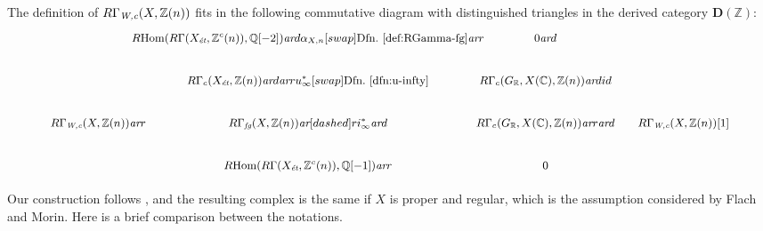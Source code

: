 \documentclass[leqno,12pt]{article}
\theoremstyle{plain}
\theoremstyle{definition}
\DeclareMathOperator{\Hom}{Hom}
\newcommand{\CC}{\mathbb{C}}
\newcommand{\QQ}{\mathbb{Q}}
\newcommand{\RR}{\mathbb{R}}
\newcommand{\ZZ}{\mathbb{Z}}
\newcommand{\Wc}{\text{\it W,c}}
\newcommand{\ar}{\text{\it ar}}
\newcommand{\et}{\text{\it \'{e}t}}
\newcommand{\fg}{\text{\it fg}}
\newcommand{\RHom}{R\!\Hom}
\newcommand{\DZ}{{\mathbf{D} (\ZZ)}}
\begin{document}
The definition of $R\Gamma_\Wc (X,\ZZ(n))$ fits in the following commutative
diagram with distinguished triangles in the derived category $\DZ$:
\begin{equation}
  \label{eqn:diagram-defining-everything}
  \begin{tikzcd}[column sep=1em,font=\small]
    &[-3em] \RHom (R\Gamma (X_\et, \ZZ^c (n)), \QQ [-2]) \ar{d}{\alpha_{X,n}}[swap]{\text{Dfn.~\ref{def:RGamma-fg}}} \ar{r} &[-2.5em] 0 \ar{d} \\
    & R\Gamma_c (X_\et, \ZZ(n)) \ar{d}\ar{r}{u_\infty^*}[swap]{\text{Dfn.~\ref{dfn:u-infty}}} & R\Gamma_c (G_\RR, X (\CC), \ZZ(n))\ar{d}{id} \\
    R\Gamma_\Wc (X, \ZZ (n)) \ar{r} & R\Gamma_\fg (X, \ZZ(n)) \ar[dashed]{r}{i_\infty^*}\ar{d} & R\Gamma_c (G_\RR, X (\CC), \ZZ(n)) \ar{r} \ar{d} & R\Gamma_\Wc (X, \ZZ (n)) [1] \\
    & \RHom (R\Gamma (X_\et, \ZZ^c (n)), \QQ [-1]) \ar{r} & 0
  \end{tikzcd}
\end{equation}

Our construction follows \cite{Flach-Morin-2018}, and the resulting complex is
the same if $X$ is proper and regular, which is the assumption considered
by Flach and Morin. Here is a brief comparison between the notations.
\end{document}
